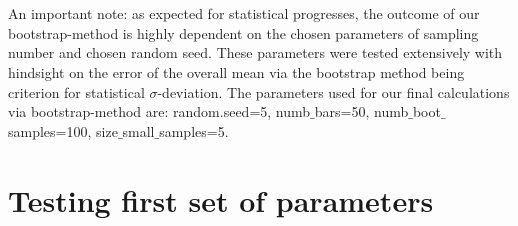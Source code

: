 \documentclass[11pt, letterpaper, onecolumn]{article}
\begin{document}
	\\
	\\
	An important note: as expected for statistical progresses, the outcome of our bootstrap-method is highly dependent on the chosen parameters of sampling number and chosen random seed. These parameters were tested extensively with hindsight on the error of the overall mean via the bootstrap method being criterion for statistical $\sigma$-deviation. The parameters used for our final calculations via bootstrap-method are: random.seed=5, numb$\_$bars=50, numb$\_$boot$\_$samples=100, size$\_$small$\_$samples=5. \\
	
	




	\section{Testing first set of parameters}
	
\end{document}
